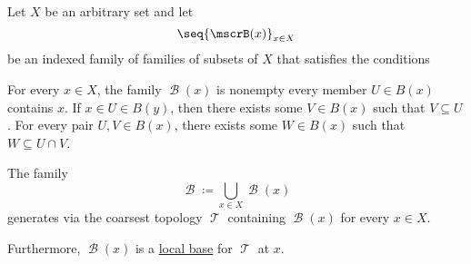 \begin{proposition}\label{thm:topology_from_local_base}
  Let \( X \) be an arbitrary set and let
  \begin{equation*}
    \seq{ \mscrB(x) }_{x \in X}
  \end{equation*}
  be an indexed family of families of subsets of \( X \) that satisfies the conditions
  \begin{thmenum}
     For every \( x \in X \), the family \( \mscrB(x) \) is nonempty every member \( U \in B(x) \) contains \( x \).
     If \( x \in U \in B(y) \), then there exists some \( V \in B(x) \) such that \( V \subseteq U \).
     For every pair \( U, V \in B(x) \), there exists some \( W \in B(x) \) such that \( W \subseteq U \cap V \).
  \end{thmenum}

  The family
  \begin{equation*}
    \mscrB \coloneqq \bigcup_{x \in X} \mscrB(x)
  \end{equation*}
  generates via  the coarsest topology \( \mscrT \) containing \( \mscrB(x) \) for every \( x \in X \).

  Furthermore, \( \mscrB(x) \) is a \hyperref[def:topological_local_base]{local base} for \( \mscrT \) at \( x \).
\end{proposition}
